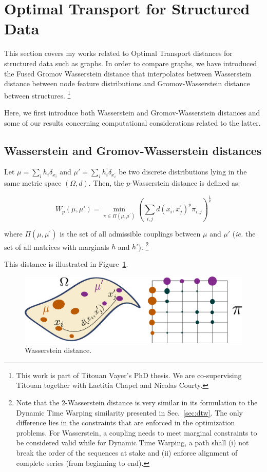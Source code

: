 \section{Optimal Transport for Structured Data}
\label{sec:ot}

This section covers my works related to Optimal Transport distances for
structured data such as graphs.
In order to compare graphs, we have introduced the Fused Gromov Wasserstein
distance that interpolates between Wasserstein distance between node feature
distributions and Gromov-Wasserstein distance between structures.%
\footnote{This work is part of Titouan Vayer's PhD thesis.
We are co-supervising Titouan together with Laetitia Chapel and Nicolas Courty.}

Here, we first introduce both Wasserstein and Gromov-Wasserstein distances and
some of our results concerning computational considerations related to the
latter.

\subsection{Wasserstein and Gromov-Wasserstein distances}

Let $\mu = \sum_i h_i \delta_{x_i}$ and $\mu' = \sum_i h^\prime_i \delta_{x^\prime_i}$
be two
discrete distributions lying in the same metric space $(\Omega, d)$.
Then, the $p$-Wasserstein distance is defined as:

\begin{equation}
    W_p(\mu, \mu') = \min_{\pi \in \Pi(\mu, \mu^\prime)}
        \left(\sum_{i,j} d(x_i, x^\prime_j)^p \pi_{i,j} \right)^{\frac{1}{p}}
    \label{eq:wass}
\end{equation}

where $\Pi(\mu, \mu^\prime)$ is the set of all admissible couplings between
$\mu$ and $\mu'$ (\emph{ie.} the set of all matrices with marginals $h$ and $h'$).%
\footnote{Note that the 2-Wasserstein distance is very similar in its formulation to
the Dynamic Time Warping similarity presented in Sec.~\ref{sec:dtw}.
The only difference lies in the constraints that are enforced in the
optimization problems.
For Wasserstein, a coupling needs to meet marginal constraints to be considered
valid while for Dynamic Time Warping, a path shall (i) not break the order of
the sequences at stake and (ii) enforce alignment of complete series (from
beginning to end).}

This distance is illustrated in Figure~\ref{fig:wass}.

\begin{figure}
\centering
\includegraphics[width=.6\textwidth]{fig/wass}
\caption{Wasserstein distance. \label{fig:wass}}
\end{figure}

